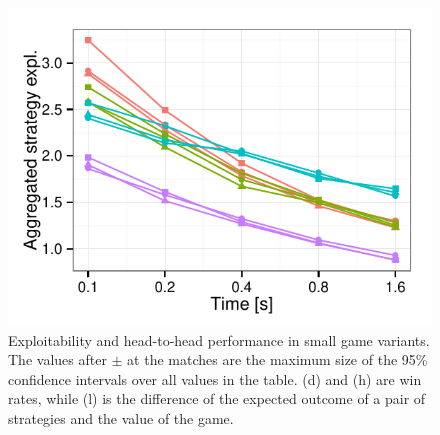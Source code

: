 \documentclass{aamas2015}
\begin{document}
\begin{figure}[t]
{\begin{minipage}{0.235\textwidth}
\includegraphics[width=\textwidth]{fig/agg_OSS-IST-WC_convergence-GP_2_2_3_3}
\end{minipage}}

\caption{Exploitability and head-to-head performance in small game variants. The values after $\pm$ at the matches are the maximum size of the 95\% confidence intervals over all values in the table. (d) and (h) are win rates, while (l) is the difference of the  expected outcome of a pair of strategies and the value of the game.}\label{fig:small}
\end{figure}
\end{document}
